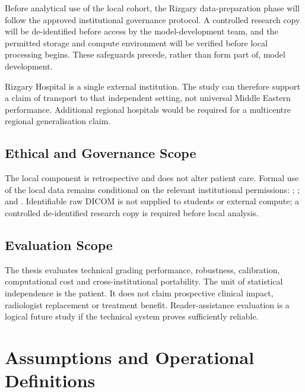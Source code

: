 Before analytical use of the local cohort, the Rizgary data-preparation phase will
follow the approved institutional governance protocol. A controlled research copy will
be de-identified before access by the model-development team, and the permitted storage
and compute environment will be verified before local processing begins. These safeguards
precede, rather than form part of, model development.

Rizgary Hospital is a single external institution. The study can therefore support a
claim of transport to that independent setting, not universal Middle Eastern
performance. Additional regional hospitals would be required for a multicentre
regional generalisation claim.

\subsection{Ethical and Governance Scope}
\label{sec:intro-scope-ethics}

The local component is retrospective and does not alter patient care. Formal use of
the local data remains conditional on the relevant institutional permissions:
;
; and
. Identifiable raw DICOM is not supplied to students or
external compute; a controlled de-identified research copy is required before local
analysis.

\subsection{Evaluation Scope}
\label{sec:intro-scope-evaluation}

The thesis evaluates technical grading performance, robustness, calibration,
computational cost and cross-institutional portability. The unit of statistical
independence is the patient. It does not claim prospective clinical impact,
radiologist replacement or treatment benefit. Reader-assistance evaluation is a
logical future study if the technical system proves sufficiently reliable.

\section{Assumptions and Operational Definitions}
\label{sec:intro-definitions}

